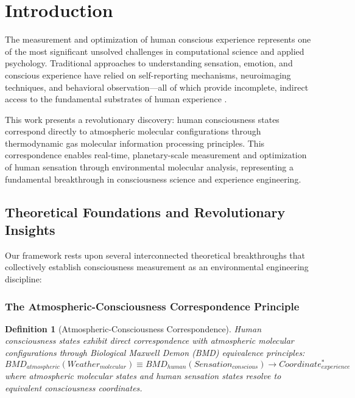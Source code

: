 \documentclass[12pt,a4paper]{article}
\newtheorem{definition}{Definition}
\begin{document}
\section{Introduction}

The measurement and optimization of human conscious experience represents one of the most significant unsolved challenges in computational science and applied psychology. Traditional approaches to understanding sensation, emotion, and conscious experience have relied on self-reporting mechanisms, neuroimaging techniques, and behavioral observation—all of which provide incomplete, indirect access to the fundamental substrates of human experience \citep{chalmers1995facing, nagel1974like, jackson1986knowledge}.

This work presents a revolutionary discovery: human consciousness states correspond directly to atmospheric molecular configurations through thermodynamic gas molecular information processing principles. This correspondence enables real-time, planetary-scale measurement and optimization of human sensation through environmental molecular analysis, representing a fundamental breakthrough in consciousness science and experience engineering.

\subsection{Theoretical Foundations and Revolutionary Insights}

Our framework rests upon several interconnected theoretical breakthroughs that collectively establish consciousness measurement as an environmental engineering discipline:

\subsubsection{The Atmospheric-Consciousness Correspondence Principle}

\begin{definition}[Atmospheric-Consciousness Correspondence]
Human consciousness states exhibit direct correspondence with atmospheric molecular configurations through Biological Maxwell Demon (BMD) equivalence principles:
\begin{equation}
BMD_{atmospheric}(Weather_{molecular}) \equiv BMD_{human}(Sensation_{conscious}) \rightarrow Coordinate_{experience}^*
\end{equation}
where atmospheric molecular states and human sensation states resolve to equivalent consciousness coordinates.
\end{definition}
\end{document}
